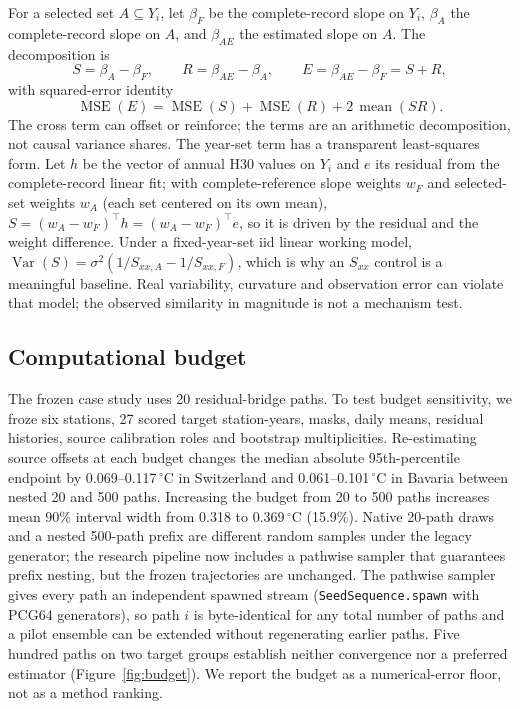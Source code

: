 For a selected set $A\subseteq Y_i$, let $\beta_F$ be the complete-record slope on $Y_i$, $\beta_A$ the complete-record slope on $A$, and $\beta_{AE}$ the estimated slope on $A$. The decomposition is
\begin{equation}
S=\beta_A-\beta_F,\qquad R=\beta_{AE}-\beta_A,\qquad E=\beta_{AE}-\beta_F=S+R,
\label{eq:decomposition}
\end{equation}
with squared-error identity
\begin{equation}
\operatorname{MSE}(E)=\operatorname{MSE}(S)+\operatorname{MSE}(R)+2\,\operatorname{mean}(SR).
\label{eq:mse}
\end{equation}
The cross term can offset or reinforce; the terms are an arithmetic decomposition, not causal variance shares. The year-set term has a transparent least-squares form. Let $h$ be the vector of annual $\mathrm{H30}$ values on $Y_i$ and $e$ its residual from the complete-record linear fit; with complete-reference slope weights $w_F$ and selected-set weights $w_A$ (each set centered on its own mean), $S=(w_A-w_F)^\top h=(w_A-w_F)^\top e$, so it is driven by the residual and the weight difference. Under a fixed-year-set iid linear working model, $\operatorname{Var}(S)=\sigma^2(1/S_{xx,A}-1/S_{xx,F})$, which is why an $S_{xx}$ control is a meaningful baseline. Real variability, curvature and observation error can violate that model; the observed similarity in magnitude is not a mechanism test.

\subsection{Computational budget}

The frozen case study uses 20 residual-bridge paths. To test budget sensitivity, we froze six stations, 27 scored target station-years, masks, daily means, residual histories, source calibration roles and bootstrap multiplicities. Re-estimating source offsets at each budget changes the median absolute 95th-percentile endpoint by 0.069--0.117\,$^{\circ}$C in Switzerland and 0.061--0.101\,$^{\circ}$C in Bavaria between nested 20 and 500 paths. Increasing the budget from 20 to 500 paths increases mean 90\% interval width from 0.318 to 0.369\,$^{\circ}$C (15.9\%). Native 20-path draws and a nested 500-path prefix are different random samples under the legacy generator; the research pipeline now includes a pathwise sampler that guarantees prefix nesting, but the frozen trajectories are unchanged. The pathwise sampler gives every path an independent spawned stream (\texttt{SeedSequence.spawn} with PCG64 generators), so path $i$ is byte-identical for any total number of paths and a pilot ensemble can be extended without regenerating earlier paths. Five hundred paths on two target groups establish neither convergence nor a preferred estimator (Figure~\ref{fig:budget}). We report the budget as a numerical-error floor, not as a method ranking.

